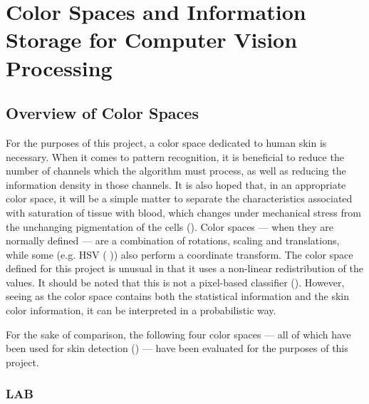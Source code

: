 
\chapter{Color Spaces and Information Storage for Computer Vision Processing}

\ifpdf
    \graphicspath{{Chapter2/Figs/Raster/}{Chapter2/Figs/PDF/}{Chapter2/Figs/}}
\else
    \graphicspath{{Chapter2/Figs/Vector/}{Chapter2/Figs/}}
\fi


\section{Overview of Color Spaces}

For the purposes of this project, a color space dedicated to human skin is necessary. When it comes to pattern recognition, it is beneficial to reduce the number of channels which the algorithm must process, as well as reducing the information density in those channels. It is also hoped that, in an appropriate color space, it will be a simple matter to separate the characteristics associated with saturation of tissue with blood, which changes under mechanical stress from the unchanging pigmentation of the cells (\cite{Stamatas2004}). Color spaces --- when they are normally defined --- are a combination of rotations, scaling and translations, while some (e.g. HSV (\cite{Vezhnevets2003, Zarit1999a} )) also perform a coordinate transform. The color space defined for this project is unusual in that it uses a non-linear redistribution of the values. It should be noted that this is not a pixel-based classifier (\cite{Jones2002}). However, seeing as the color space contains both the statistical information and the skin color information, it can be interpreted in a probabilistic way.

For the sake of comparison, the following four color spaces --- all of which have been used for skin detection (\cite{Vezhnevets2003,Zarit1999a,Yang1997a,Brand2000a,Sigal2000a,Chai2000a,Phung2002a}) --- have been evaluated for the purposes of this project.

\subsection{LAB}\label{sec:LAB}


